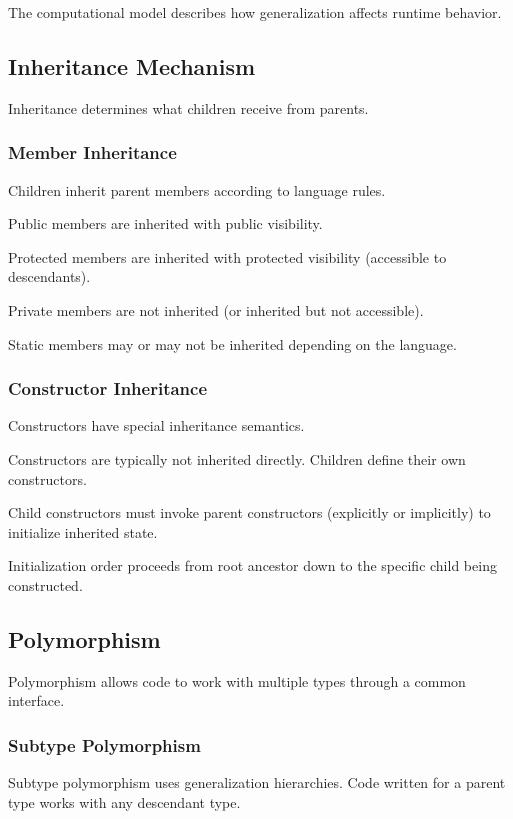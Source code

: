 \documentclass[11pt]{article}
\begin{document}
The computational model describes how generalization affects runtime behavior.

\subsection{Inheritance Mechanism}

Inheritance determines what children receive from parents.

\subsubsection{Member Inheritance}

Children inherit parent members according to language rules.

Public members are inherited with public visibility.

Protected members are inherited with protected visibility (accessible to descendants).

Private members are not inherited (or inherited but not accessible).

Static members may or may not be inherited depending on the language.

\subsubsection{Constructor Inheritance}

Constructors have special inheritance semantics.

Constructors are typically not inherited directly. Children define their own constructors.

Child constructors must invoke parent constructors (explicitly or implicitly) to initialize inherited state.

Initialization order proceeds from root ancestor down to the specific child being constructed.

\subsection{Polymorphism}

Polymorphism allows code to work with multiple types through a common interface.

\subsubsection{Subtype Polymorphism}

Subtype polymorphism uses generalization hierarchies. Code written for a parent type works with any descendant type.
\end{document}
